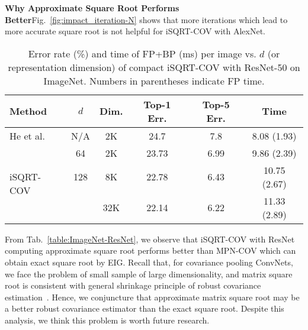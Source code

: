 \documentclass[10pt,twocolumn,letterpaper]{article}
\begin{document}
\vspace{4pt}\noindent\textbf{Why Approximate Square Root Performs Better}\quad  Fig.~\ref{fig:impact_iteration-N} shows that  more iterations which lead to more accurate square root is not helpful for  iSQRT-COV with AlexNet. 
\begin{table}[thb]
\setlength\tabcolsep{4pt}
	\renewcommand{\baselinestretch}{1.05}
\footnotesize
	\centering
\begin{minipage}[t]{1.0\linewidth}
		\centering
		\begin{tabular}{|l|c|c|c|c|c|}
			\hline
			Method  & $d$ & Dim. & Top-1 Err.   &  Top-5 Err. & Time \\
			\hline
			\hline
			He et al.~\cite{He_2016_CVPR}  & N/A & 2K& 24.7 &  7.8 & 8.08 (1.93) \\
			\hline
			\multirow{3}{*}{iSQRT-COV}   & 64 & 2K    & 23.73   & 6.99 &  9.86 (2.39) \\
			&  128 & 8K        & 22.78  & 6.43  & 10.75 (2.67)\\
			&  \;256\; & 32K       & 22.14  & 6.22 & 11.33 (2.89)\\
			\hline
		\end{tabular}
	\end{minipage}
	\renewcommand{\baselinestretch}{1.0}
	\caption{Error rate (\%) and time of FP+BP (ms) per image vs. $d$ (or representation  dimension) of compact  iSQRT-COV with ResNet-50  on ImageNet. Numbers in parentheses indicate FP time.  }
	\label{table:compact-iSQRT-COV}
\end{table}
From Tab.~\ref{table:ImageNet-ResNet}, we observe that iSQRT-COV with ResNet computing approximate square root performs better than MPN-COV which can obtain exact square root by EIG. Recall that, for covariance pooling ConvNets, we face the problem of small sample of large dimensionality,  and matrix square root is consistent with general shrinkage principle of robust covariance estimation~\cite{Li_2017_ICCV}. Hence,  we conjuncture that approximate  matrix square root  may be a better robust covariance estimator than the exact square root. Despite this analysis, we think this  problem is  worth future research.
\end{document}
